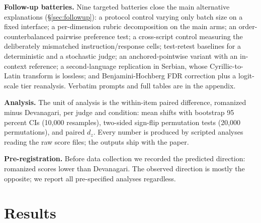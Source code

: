 \textbf{Follow-up batteries.} Nine targeted batteries close the main alternative explanations (\S\ref{sec:followup}): a protocol control varying only batch size on a fixed interface; a per-dimension rubric decomposition on the main arms; an order-counterbalanced pairwise preference test; a cross-script control measuring the deliberately mismatched instruction/response cells; test-retest baselines for a deterministic and a stochastic judge; an anchored-pointwise variant with an in-context reference; a second-language replication in Serbian, whose Cyrillic-to-Latin transform is lossless; and Benjamini-Hochberg FDR correction plus a logit-scale tier reanalysis. Verbatim prompts and full tables are in the appendix.

\textbf{Analysis.} The unit of analysis is the within-item paired difference, romanized minus Devanagari, per judge and condition: mean shifts with bootstrap 95 percent CIs (10{,}000 resamples), two-sided sign-flip permutation tests (20{,}000 permutations), and paired $d_z$. Every number is produced by scripted analyses reading the raw score files; the outputs ship with the paper.

\textbf{Pre-registration.} Before data collection we recorded the predicted direction: romanized scores lower than Devanagari. The observed direction is mostly the opposite; we report all pre-specified analyses regardless.

\section{Results}
\label{sec:results}

